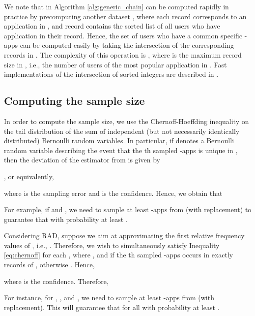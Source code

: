 \documentclass{acm_proc_article-sp}
\theoremstyle{plain}
\theoremstyle{plain}
\theoremstyle{plain}
\theoremstyle{plain}
\theoremstyle{plain}
\theoremstyle{plain}
\begin{document}
We note that  in Algorithm \ref{alg:generic_chain} can be computed rapidly in practice by precomputing another dataset , where each record corresponds to an application in , and record  contains the sorted list of all users who have application  in their record. Hence, the set of users who have a common specific -apps can be  computed easily  by taking the intersection of the corresponding records in . The complexity of this operation is , where  is the maximum record size in , i.e., the number of users of the most popular application in . Fast implementations of the intersection of sorted integers are described in \cite{LemireBK14}. 






\subsection{Computing the sample size}

In order to compute the sample size, we use the Chernoff-Hoeffding inequality \cite{Hoeffding1963} on the tail distribution of the sum of independent (but not necessarily identically distributed) Bernoulli random variables. In particular, if  denotes a Bernoulli random variable describing the event that the th sampled -apps is unique in , then the deviation of the estimator  from  is given by 

, or equivalently,

where  is the sampling error and  is the confidence. Hence, we obtain that 

For example, if  and , we need to sample at least  -apps from  (with replacement) to guarantee that  with probability at least .


Considering RAD, suppose we aim at approximating the first  relative frequency values of , i.e., . Therefore, we wish to simultaneously satisfy Inequality \ref{eq:chernoff} for each  , where  , and  if the th sampled -apps occurs in exactly  records of , otherwise . Hence,

where  is the confidence. Therefore, 

For instance, for , , and , we need to sample at least  -apps from  (with replacement). This will guarantee that  for all  with probability at least .
\end{document}
